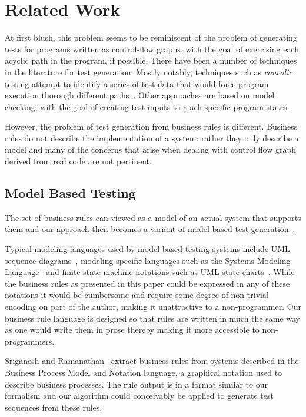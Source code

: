 \section{Related Work}

At first blush, this problem seems to be reminiscent of the problem of
generating tests for programs written as control-flow graphs, with the
goal of exercising each acyclic path in the program, if possible.
There have been a number of techniques in the literature for test
generation. Mostly notably, techniques such as \textit{concolic}
testing attempt to identify a series of test data that would force
program execution thorough different paths~\cite{dart, concolic}.  Other
approaches are based on model checking, with the goal of creating test
inputs to reach specific program states.

However, the problem of test generation from business rules is
different. Business rules do not describe the implementation of a
system: rather they only describe a model and many of the concerns
that arise when dealing with control flow graph derived from real code
are not pertinent.

\subsection{Model Based Testing}

The set of business rules can viewed as a model of an actual system
that supports them and our approach then becomes a variant of model
based test generation~\cite{utting2012}.

Typical modeling languages used by model based testing systems include
UML sequence diagrams~\cite{nayak2009}, modeling specific languages
such as the Systems Modeling Language~\cite{friedenthal2011} and
finite state machine notations such as UML state
charts~\cite{offhut99}. While the business rules as presented in this
paper could be expressed in any of these notations it would be
cumbersome and require some degree of non-trivial encoding on part of
the author, making it unattractive to a non-programmer. Our business
rule language is designed so that rules are written in much the same
way as one would write them in prose thereby making it more accessible
to non-programmers.

Sriganesh and Ramanathan~\cite{sriganesh2012} extract business rules
from systems described in the Business Process Model and Notation
language, a graphical notation used to describe business
processes. The rule output is in a format similar to our formalism and
our algorithm could conceivably be applied to generate test sequences
from these rules.

